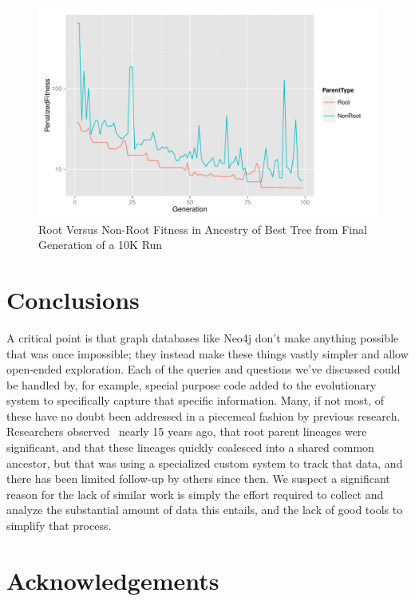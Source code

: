 \documentclass[12pt]{article}
\begin{document}
\begin{figure}[tb]
 \centering
 \includegraphics[height=0.68\textwidth]{Root_vs_nonroot_line_fitnesses}
 \caption{Root Versus Non-Root Fitness in Ancestry of Best Tree from Final Generation of a 10K Run}
 \label{fig:rootVsNonrootFitness}
\end{figure}


\section{Conclusions} \label{sec:conclusion}

A critical point is that graph databases like Neo4j don't make anything possible that was once impossible; they instead make these things vastly simpler and allow open-ended exploration. Each of the queries and questions we've discussed could be handled by, for example, special purpose code added to the evolutionary system to specifically capture that specific information. Many, if not most, of these have no doubt been addressed in a piecemeal fashion by previous research. Researchers observed~\cite{mcphee1999analysis} nearly 15 years ago, that root parent lineages were significant, and that these lineages quickly coalesced into a shared common ancestor, but that was using a specialized custom system to track that data, and there has been limited follow-up by others since then. We suspect a significant reason for the lack of similar work is simply the effort required to collect and analyze the substantial amount of data this entails, and the lack of good tools to simplify that process.

\section*{Acknowledgements}



\end{document}
